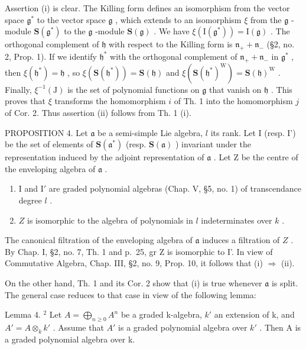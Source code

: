 Assertion (i) is clear. The Killing form defines an isomorphism from the vector space \(\mathfrak{g}^*\) to the vector space \(\mathfrak{g}\) , which extends to an isomorphism \(\xi\) from the \(\mathfrak{g}\) -module \(\mathbf{S}(\mathfrak{g}^*)\) to the \(\mathfrak{g}\) -module \(\mathbf{S}(\mathfrak{g})\) . We have \(\xi (\mathrm{I}(\mathfrak{g}^*)) = \mathrm{I}(\mathfrak{g})\) . The orthogonal complement of \(\mathfrak{h}\) with respect to the Killing form is \(\mathfrak{n}_{+} + \mathfrak{n}_{-}\) (§2, no. 2, Prop. 1). If we identify \(\mathfrak{h}^*\) with the orthogonal complement of \(\mathfrak{n}_{+} + \mathfrak{n}_{-}\) in \(\mathfrak{g}^*\) , then \(\xi (\mathfrak{h}^*) = \mathfrak{h}\) , so \(\xi (\mathbf{S}(\mathfrak{h}^*)) = \mathbf{S}(\mathfrak{h})\) and \(\xi (\mathbf{S}(\mathfrak{h}^*)^{\mathrm{W}}) = \mathbf{S}(\mathfrak{h})^{\mathrm{W}}\) . Finally, \(\xi^{-1}(\mathrm{J})\) is the set of polynomial functions on \(\mathfrak{g}\) that vanish on \(\mathfrak{h}\) . This proves that \(\xi\) transforms the homomorphism \(i\) of Th. 1 into the homomorphism \(j\) of Cor. 2. Thus assertion (ii) follows from Th. 1 (i).

PROPOSITION 4. Let \(\mathfrak{a}\) be a semi-simple Lie algebra, \(l\) its rank. Let I (resp. I') be the set of elements of \(\mathbf{S}(\mathfrak{a}^{*})\) (resp. \(\mathbf{S}(\mathfrak{a})\) ) invariant under the representation induced by the adjoint representation of \(\mathfrak{a}\) . Let Z be the centre of the enveloping algebra of \(\mathfrak{a}\) .

\begin{enumerate}
\def\labelenumi{(\roman{enumi})}
\item
  I and \(\mathrm{I}'\) are graded polynomial algebras (Chap. V, §5, no. 1) of transcendance degree \(l\) .
\item
  \(Z\) is isomorphic to the algebra of polynomials in \(l\) indeterminates over \(k\) .
\end{enumerate}

The canonical filtration of the enveloping algebra of \(\mathfrak{a}\) induces a filtration of \(Z\) . By Chap. I, §2, no. 7, Th. 1 and p.~25, gr Z is isomorphic to I'. In view of Commutative Algebra, Chap. III, §2, no. 9, Prop. 10, it follows that (i) \(\Longrightarrow\) (ii).

On the other hand, Th. 1 and its Cor. 2 show that (i) is true whenever \(\mathfrak{a}\) is split. The general case reduces to that case in view of the following lemma:

Lemma 4. \(^{2}\) Let \(A = \bigoplus_{n \geq 0} A^{n}\) be a graded k-algebra, \(k'\) an extension of k, and \(A' = A \otimes_{k} k'\) . Assume that \(A'\) is a graded polynomial algebra over \(k'\) . Then A is a graded polynomial algebra over k.

